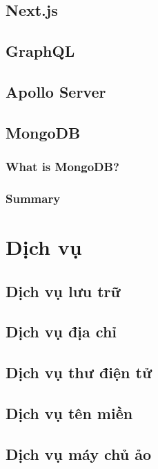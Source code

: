 \subsection{Next.js}
\blindtext
\subsection{GraphQL}
\subsection{Apollo Server}
\subsection{MongoDB}
\subsubsection{What is MongoDB?}
\subsubsection{Summary}

\section{Dịch vụ}

\subsection{Dịch vụ lưu trữ}
\subsection{Dịch vụ địa chỉ}
\subsection{Dịch vụ thư điện tử}
\subsection{Dịch vụ tên miền}
\subsection{Dịch vụ máy chủ ảo}
